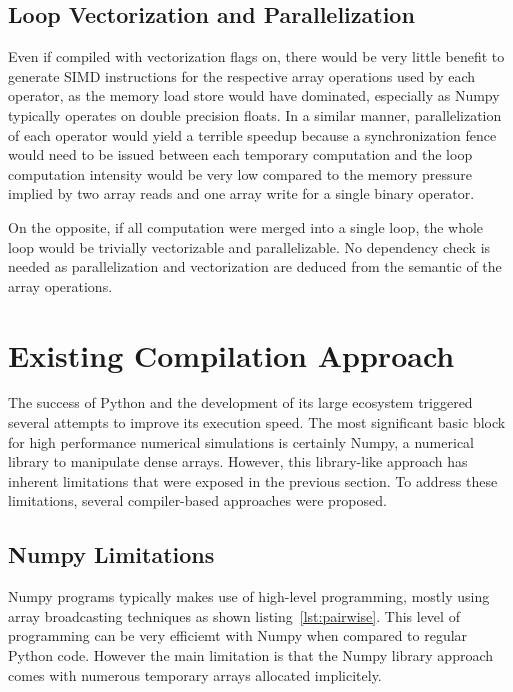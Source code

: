 \documentclass[10pt, preprint]{sigplanconf}
\begin{document}
\subsection{Loop Vectorization and Parallelization}

Even if compiled with vectorization flags on, there would be very little
benefit to generate SIMD instructions for the respective array operations used
by each operator, as the memory load store would have dominated, especially as
Numpy typically operates on double precision floats. In a similar manner,
parallelization of each operator would yield a terrible speedup because a
synchronization fence would need to be issued between each temporary
computation and the loop computation intensity would be very low compared to
the memory pressure implied by two array reads and one array write for a single
binary operator.

On the opposite, if all computation were merged into a single loop, the whole
loop would be trivially vectorizable and parallelizable.
No dependency check is needed as parallelization and vectorization are deduced
from the semantic of the array operations.

\section{Existing Compilation Approach}
\label{sec:compilers}

The success of Python and the development of its large ecosystem triggered
several attempts to improve its execution speed. The most significant basic
block for high performance numerical simulations is certainly Numpy, a
numerical library to manipulate dense arrays. However, this library-like
approach has inherent limitations that were exposed in the previous section.
To address these limitations, several compiler-based approaches were proposed.

\subsection{Numpy Limitations}

Numpy programs typically makes use of high-level programming, mostly using
array broadcasting techniques as shown listing~\ref{lst:pairwise}. This level
of programming can be very efficiemt with Numpy when compared to regular Python
code. However the main limitation is that the Numpy library approach comes with
numerous temporary arrays allocated implicitely.
\end{document}
